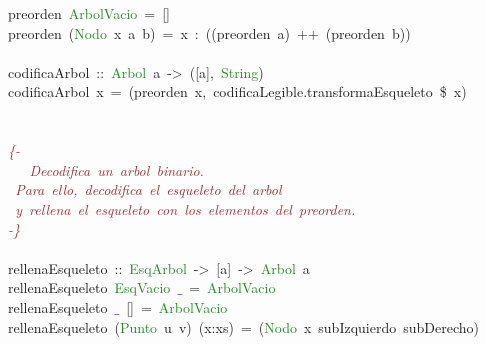 \begin{allintypewriter}
\mbox{}preorden\ \textcolor{ForestGreen}{ArbolVacio}\ \textcolor{BrickRed}{=}\ \textcolor{BrickRed}{[]} \\
\mbox{}preorden\ \textcolor{BrickRed}{(}\textcolor{ForestGreen}{Nodo}\ x\ a\ b\textcolor{BrickRed}{)}\ \textcolor{BrickRed}{=}\ x\ \textcolor{BrickRed}{:}\ \textcolor{BrickRed}{((}preorden\ a\textcolor{BrickRed}{)}\ \textcolor{BrickRed}{++}\ \textcolor{BrickRed}{(}preorden\ b\textcolor{BrickRed}{))} \\
\mbox{} \\
\mbox{}codificaArbol\ \textcolor{BrickRed}{::}\ \textcolor{ForestGreen}{Arbol}\ a\ \textcolor{BrickRed}{-\textgreater{}}\ \textcolor{BrickRed}{([}a\textcolor{BrickRed}{],}\ \textcolor{ForestGreen}{String}\textcolor{BrickRed}{)} \\
\mbox{}codificaArbol\ x\ \textcolor{BrickRed}{=}\ \textcolor{BrickRed}{(}preorden\ x\textcolor{BrickRed}{,}\ codificaLegible\textcolor{BrickRed}{.}transformaEsqueleto\ \textcolor{BrickRed}{\$}\ x\textcolor{BrickRed}{)} \\
\mbox{} \\
\mbox{} \\
\mbox{}\textit{\textcolor{Brown}{\{-}} \\
\mbox{}\textit{\textcolor{Brown}{\ \ \ Decodifica\ un\ arbol\ binario.}} \\
\mbox{}\textit{\textcolor{Brown}{\ Para\ ello,\ decodifica\ el\ esqueleto\ del\ arbol\ }} \\
\mbox{}\textit{\textcolor{Brown}{\ y\ rellena\ el\ esqueleto\ con\ los\ elementos\ del\ preorden.}} \\
\mbox{}\textit{\textcolor{Brown}{-\}}} \\
\mbox{} \\
\mbox{}rellenaEsqueleto\ \textcolor{BrickRed}{::}\ \textcolor{ForestGreen}{EsqArbol}\ \textcolor{BrickRed}{-\textgreater{}}\ \textcolor{BrickRed}{[}a\textcolor{BrickRed}{]}\ \textcolor{BrickRed}{-\textgreater{}}\ \textcolor{ForestGreen}{Arbol}\ a \\
\mbox{}rellenaEsqueleto\ \textcolor{ForestGreen}{EsqVacio}\ \textbf{\textcolor{Blue}{$\_$}}\ \textcolor{BrickRed}{=}\ \textcolor{ForestGreen}{ArbolVacio} \\
\mbox{}rellenaEsqueleto\ \textbf{\textcolor{Blue}{$\_$}}\ \textcolor{BrickRed}{[]}\ \textcolor{BrickRed}{=}\ \textcolor{ForestGreen}{ArbolVacio} \\
\mbox{}rellenaEsqueleto\ \textcolor{BrickRed}{(}\textcolor{ForestGreen}{Punto}\ u\ v\textcolor{BrickRed}{)}\ \textcolor{BrickRed}{(}x\textcolor{BrickRed}{:}xs\textcolor{BrickRed}{)}\ \textcolor{BrickRed}{=}\ \textcolor{BrickRed}{(}\textcolor{ForestGreen}{Nodo}\ x\ subIzquierdo\ subDerecho\textcolor{BrickRed}{)} \\

\end{allintypewriter}
